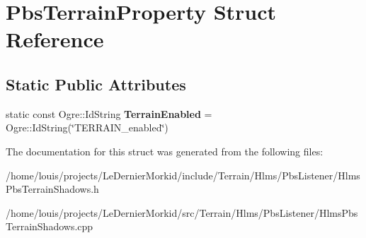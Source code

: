\hypertarget{struct_pbs_terrain_property}{}\section{Pbs\+Terrain\+Property Struct Reference}
\label{struct_pbs_terrain_property}
\subsection*{Static Public Attributes}
\begin{DoxyCompactItemize}
\item 
\mbox{\label{struct_pbs_terrain_property_a8fecc53ec81dc75f241a916242417d12}} 
static const Ogre\+::\+Id\+String {\bfseries Terrain\+Enabled} = Ogre\+::\+Id\+String(\char`\"{}T\+E\+R\+R\+A\+I\+N\+\_\+enabled\char`\"{})
\end{DoxyCompactItemize}


The documentation for this struct was generated from the following files\+:\begin{DoxyCompactItemize}
\item 
/home/louis/projects/\+Le\+Dernier\+Morkid/include/\+Terrain/\+Hlms/\+Pbs\+Listener/Hlms\+Pbs\+Terrain\+Shadows.\+h\item 
/home/louis/projects/\+Le\+Dernier\+Morkid/src/\+Terrain/\+Hlms/\+Pbs\+Listener/Hlms\+Pbs\+Terrain\+Shadows.\+cpp\end{DoxyCompactItemize}
